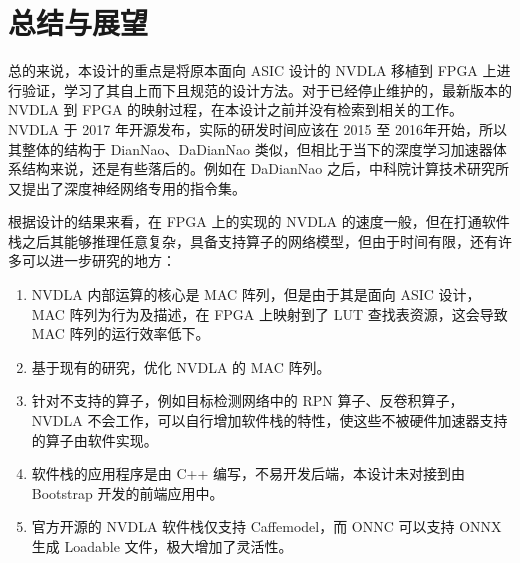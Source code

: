 \chapter{总结与展望}\label{chap:conclusion}

总的来说，本设计的重点是将原本面向 ASIC 设计的 NVDLA 移植到 FPGA 上进行验证，学习了其自上而下且规范的设计方法。对于已经停止维护的，最新版本的 NVDLA 到 FPGA 的映射过程，在本设计之前并没有检索到相关的工作。NVDLA 于 2017 年开源发布，实际的研发时间应该在 2015 至 2016年开始，所以其整体的结构于 DianNao、DaDianNao 类似，但相比于当下的深度学习加速器体系结构来说，还是有些落后的。例如在 DaDianNao 之后，中科院计算技术研究所又提出了深度神经网络专用的指令集。

根据设计的结果来看，在 FPGA 上的实现的 NVDLA 的速度一般，但在打通软件栈之后其能够推理任意复杂，具备支持算子的网络模型，但由于时间有限，还有许多可以进一步研究的地方：

\begin{enumerate}
    \item NVDLA 内部运算的核心是 MAC 阵列，但是由于其是面向 ASIC 设计，MAC 阵列为行为及描述，在 FPGA 上映射到了 LUT 查找表资源，这会导致 MAC 阵列的运行效率低下。
    \item 基于现有的研究\cite{祁琛2018应用于神经网络的高效能计算单元的研究与实现}，优化 NVDLA 的 MAC 阵列。
    \item 针对不支持的算子，例如目标检测网络中的 RPN 算子、反卷积算子，NVDLA 不会工作，可以自行增加软件栈的特性，使这些不被硬件加速器支持的算子由软件实现。
    \item 软件栈的应用程序是由 C++ 编写，不易开发后端，本设计未对接到由 Bootstrap 开发的前端应用中。
    \item 官方开源的 NVDLA 软件栈仅支持 Caffemodel，而 ONNC 可以支持 ONNX 生成 Loadable 文件，极大增加了灵活性。
\end{enumerate}